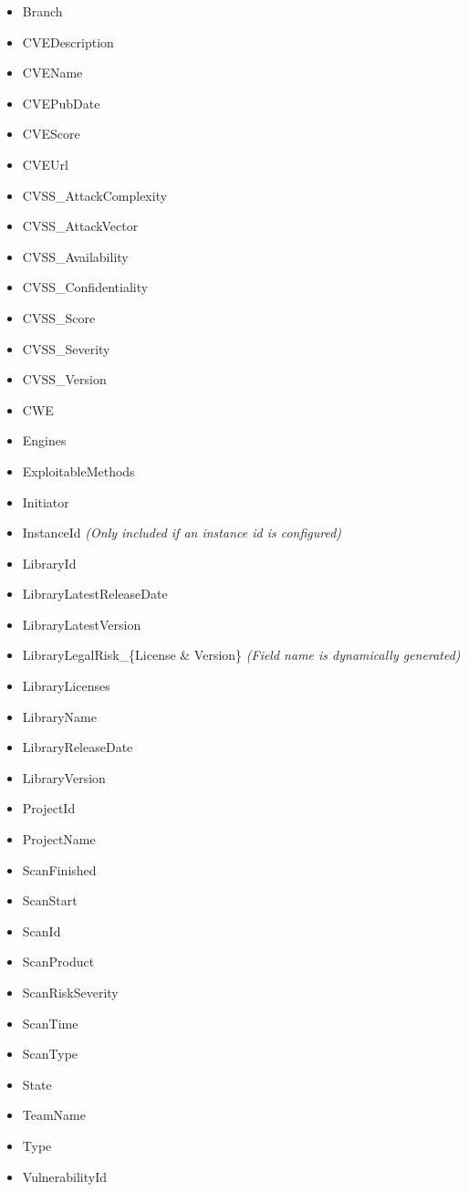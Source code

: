 \begin{itemize}
    \item Branch
    \item CVEDescription
    \item CVEName
    \item CVEPubDate
    \item CVEScore
    \item CVEUrl
    \item CVSS\_AttackComplexity
    \item CVSS\_AttackVector
    \item CVSS\_Availability
    \item CVSS\_Confidentiality
    \item CVSS\_Score
    \item CVSS\_Severity
    \item CVSS\_Version
    \item CWE
    \item Engines
    \item ExploitableMethods
    \item Initiator
    \item InstanceId \textit{(Only included if an instance id is configured)}
    \item LibraryId
    \item LibraryLatestReleaseDate
    \item LibraryLatestVersion
    \item LibraryLegalRisk\_\{License \& Version\} \textit{(Field name is dynamically generated)}
    \item LibraryLicenses
    \item LibraryName
    \item LibraryReleaseDate
    \item LibraryVersion
    \item ProjectId
    \item ProjectName
    \item ScanFinished
    \item ScanStart
    \item ScanId
    \item ScanProduct
    \item ScanRiskSeverity
    \item ScanTime
    \item ScanType
    \item State
    \item TeamName
    \item Type
    \item VulnerabilityId
\end{itemize}


